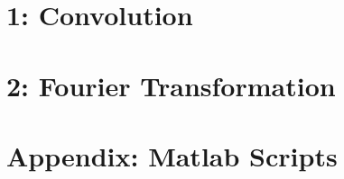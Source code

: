 \documentclass[11pt, a4paper, oneside]{article}
\begin{document}
	
	
		\section*{1: Convolution}
	
	
		\section*{2: Fourier Transformation}
	
	
	
	




\newpage
	\section*{Appendix: Matlab Scripts}
	
\end{document}

